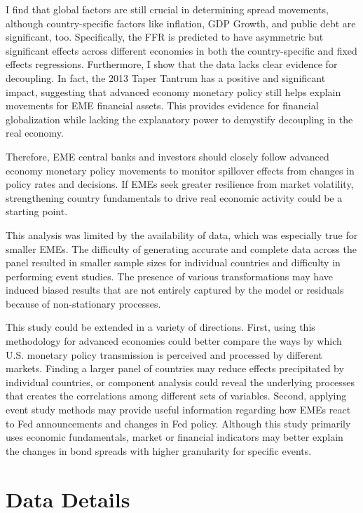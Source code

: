 \documentclass[12pt]{article}
\begin{document}
I find that global factors are still crucial in determining spread movements, although country-specific factors like inflation, GDP Growth, and public debt are significant, too. Specifically, the FFR is predicted to have asymmetric but significant effects across different economies in both the country-specific and fixed effects regressions. Furthermore, I show that the data lacks clear evidence for decoupling. In fact, the 2013 Taper Tantrum has a positive and significant impact, suggesting that advanced economy monetary policy still helps explain movements for EME financial assets. This provides evidence for financial globalization while lacking the explanatory power to demystify decoupling in the real economy.

Therefore, EME central banks and investors should closely follow advanced economy monetary policy movements to monitor spillover effects from changes in policy rates and decisions. If EMEs seek greater resilience from market volatility, strengthening country fundamentals to drive real economic activity could be a starting point.

This analysis was limited by the availability of data, which was especially true for smaller EMEs. The difficulty of generating accurate and complete data across the panel resulted in smaller sample sizes for individual countries and difficulty in performing event studies. The presence of various transformations may have induced biased results that are not entirely captured by the model or residuals because of non-stationary processes.

This study could be extended in a variety of directions. First, using this methodology for advanced economies could better compare the ways by which U.S. monetary policy transmission is perceived and processed by different markets. Finding a larger panel of countries may reduce effects precipitated by individual countries, or component analysis could reveal the underlying processes that creates the correlations among different sets of variables. Second, applying event study methods may provide useful information regarding how EMEs react to Fed announcements and changes in Fed policy. Although this study primarily uses economic fundamentals, market or financial indicators may better explain the changes in bond spreads with higher granularity for specific events.

\newpage
\printbibliography

\newpage
\appendix
\section{Data Details}
\end{document}
